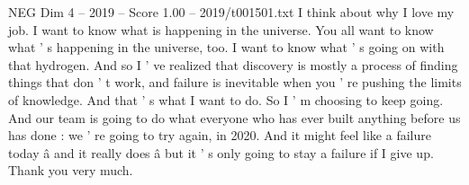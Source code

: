 \begin{textsample}{NEG Dim 4 – 2019 – Score 1.00 – 2019/t001501.txt}
I think about why I love my job.
I want to know what is happening in the universe.
You all want to know what ' s happening in the universe, too.
I want to know what ' s going on with that hydrogen.
And so I ' ve realized that discovery is mostly a process of finding things that don ' t work, and failure is inevitable when you ' re pushing the limits of knowledge.
And that ' s what I want to do.
So I ' m choosing to keep going.
And our team is going to do what everyone who has ever built anything before us has done : we ' re going to try again, in 2020.
And it might feel like a failure today â and it really does â but it ' s only going to stay a failure if I give up.
Thank you very much.

\end{textsample}
